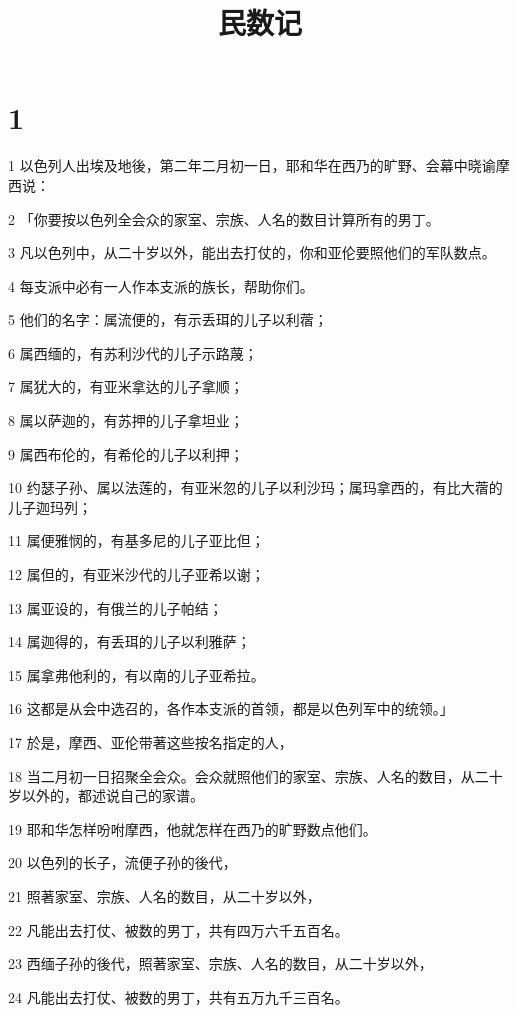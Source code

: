 

\title{民数记}


\chapter{1}

\par 1 以色列人出埃及地後，第二年二月初一日，耶和华在西乃的旷野、会幕中晓谕摩西说：
\par 2 「你要按以色列全会众的家室、宗族、人名的数目计算所有的男丁。
\par 3 凡以色列中，从二十岁以外，能出去打仗的，你和亚伦要照他们的军队数点。
\par 4 每支派中必有一人作本支派的族长，帮助你们。
\par 5 他们的名字：属流便的，有示丢珥的儿子以利蓿；
\par 6 属西缅的，有苏利沙代的儿子示路蔑；
\par 7 属犹大的，有亚米拿达的儿子拿顺；
\par 8 属以萨迦的，有苏押的儿子拿坦业；
\par 9 属西布伦的，有希伦的儿子以利押；
\par 10 约瑟子孙、属以法莲的，有亚米忽的儿子以利沙玛；属玛拿西的，有比大蓿的儿子迦玛列；
\par 11 属便雅悯的，有基多尼的儿子亚比但；
\par 12 属但的，有亚米沙代的儿子亚希以谢；
\par 13 属亚设的，有俄兰的儿子帕结；
\par 14 属迦得的，有丢珥的儿子以利雅萨；
\par 15 属拿弗他利的，有以南的儿子亚希拉。
\par 16 这都是从会中选召的，各作本支派的首领，都是以色列军中的统领。」
\par 17 於是，摩西、亚伦带著这些按名指定的人，
\par 18 当二月初一日招聚全会众。会众就照他们的家室、宗族、人名的数目，从二十岁以外的，都述说自己的家谱。
\par 19 耶和华怎样吩咐摩西，他就怎样在西乃的旷野数点他们。
\par 20 以色列的长子，流便子孙的後代，
\par 21 照著家室、宗族、人名的数目，从二十岁以外，
\par 22 凡能出去打仗、被数的男丁，共有四万六千五百名。
\par 23 西缅子孙的後代，照著家室、宗族、人名的数目，从二十岁以外，
\par 24 凡能出去打仗、被数的男丁，共有五万九千三百名。
